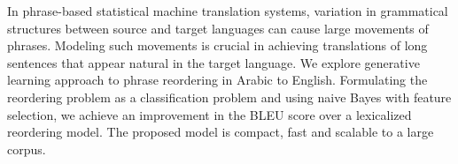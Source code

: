 In phrase-based statistical machine translation systems, variation in grammatical structures between source and target languages can cause large movements of phrases. Modeling such movements is crucial in achieving translations of long sentences that appear natural in the target language. We explore generative learning approach to phrase reordering in Arabic to English. Formulating the reordering problem as a classification problem and using naive Bayes with feature selection, we achieve an improvement in the BLEU score over a lexicalized reordering model. The proposed model is compact, fast and scalable to a large corpus.
